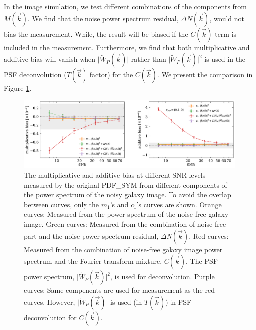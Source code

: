 \documentclass[twocolumn]{aastex62}
\begin{document}
In the image simulation, we test different combinations of the components from $M(\vec{k})$. We find that the noise power spectrum residual, $\Delta N(\vec{k})$, would not bias the measurement. While, the result will be biased if the $C(\vec{k})$ term is included in the measurement. Furthermore, we find that both multiplicative and additive bias will vanish when $\vert \widetilde{W}_{P}(\vec{k})\vert$ rather than $\vert \widetilde{W}_{P}(\vec{k})\vert^2$ is used in the PSF deconvolution ($T(\vec{k})$ factor) for the $C(\vec{k})$. We present the comparison in Figure \ref{fig:pts_componets}.

\begin{figure}[htbp]
	\centering
	\includegraphics[width=0.9\linewidth]{figures/pts_sample_components.pdf}
	\caption{The multiplicative and additive bias at different SNR levels measured by the original PDF\_SYM from different components of the power spectrum of the noisy galaxy image. To avoid the overlap between curves, only the $m_1$'s and $c_1$'s curves are shown. Orange curves: Measured from the power spectrum of the noise-free galaxy image. Green curves: Measured from the combination of noise-free part and the noise power spectrum residual, $\Delta N(\vec{k})$. Red curves: Measured from the combination of noise-free galaxy image power spectrum and the Fourier transform mixture, $C(\vec{k})$. The PSF power spectrum, $\vert \widetilde{W}_{P}(\vec{k})\vert^2$, is used for deconvolution. Purple curves: Same components are used for measurement as the red curves. However, $\vert \widetilde{W}_{P}(\vec{k})\vert$ is used (in $T(\vec{k})$) in PSF deconvolution for $C(\vec{k})$.}\label{fig:pts_componets}
\end{figure}
\end{document}
